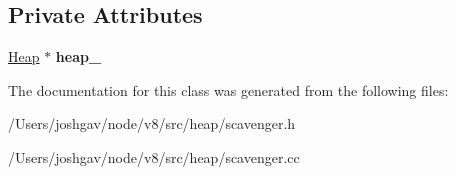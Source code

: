 \subsection*{Private Attributes}
\begin{DoxyCompactItemize}
\item 
\hyperlink{classv8_1_1internal_1_1_heap}{Heap} $\ast$ {\bfseries heap\+\_\+}\hypertarget{classv8_1_1internal_1_1_scavenge_visitor_acc84441392000aa2b8e5355def8f6d61}{}\label{classv8_1_1internal_1_1_scavenge_visitor_acc84441392000aa2b8e5355def8f6d61}

\end{DoxyCompactItemize}


The documentation for this class was generated from the following files\+:\begin{DoxyCompactItemize}
\item 
/\+Users/joshgav/node/v8/src/heap/scavenger.\+h\item 
/\+Users/joshgav/node/v8/src/heap/scavenger.\+cc\end{DoxyCompactItemize}
